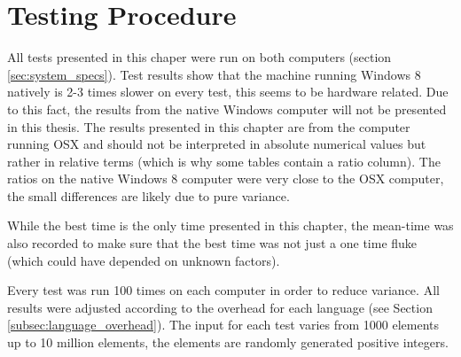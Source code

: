 \section{Testing Procedure}
All tests presented in this chaper were run on both computers (section \ref{sec:system_specs}). Test results show that the machine running Windows 8 natively is 2-3 times slower on every test, this seems to be hardware related. Due to this fact, the results from the native Windows computer will not be presented in this thesis. The results presented in this chapter are from the computer running OSX and should not be interpreted in absolute numerical values but rather in relative terms (which is why some tables contain a ratio column). The ratios on the native Windows 8 computer were very close to the OSX computer, the small differences are likely due to pure variance.

While the best time is the only time presented in this chapter, the mean-time was also recorded to make sure that the best time was not just a one time fluke (which could have depended on unknown factors). 

Every test was run 100 times on each computer in order to reduce variance. All results were adjusted according to the overhead for each language (see Section \ref{subsec:language_overhead}). The input for each test varies from 1000 elements up to 10 million elements, the elements are randomly generated positive integers. 